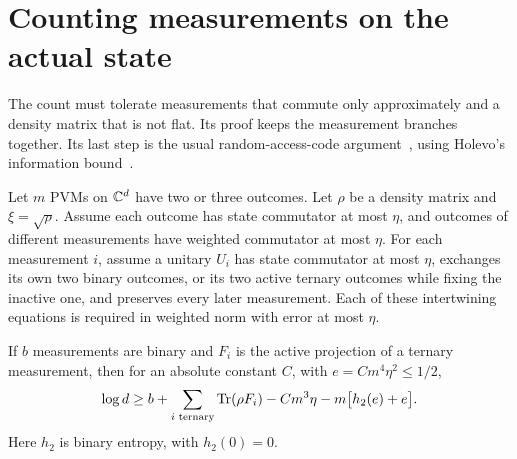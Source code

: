 \section{Counting measurements on the actual state}\label{sec:count}
The count must tolerate measurements that commute only approximately and a density matrix that is not flat. Its proof keeps the measurement branches together. Its last step is the usual random-access-code argument~\cite{Nay99}, using Holevo's information bound~\cite{Hol73}.

\begin{theorem}\label{thm:count}
Let $m$ PVMs on $\mathbb C^d$ have two or three outcomes. Let $\rho$ be a density matrix and $\xi=\sqrt\rho$. Assume each outcome has state commutator at most $\eta$, and outcomes of different measurements have weighted commutator at most $\eta$. For each measurement $i$, assume a unitary $U_i$ has state commutator at most $\eta$, exchanges its own two binary outcomes, or its two active ternary outcomes while fixing the inactive one, and preserves every later measurement. Each of these intertwining equations is required in weighted norm with error at most $\eta$.

If $b$ measurements are binary and $F_i$ is the active projection of a ternary measurement, then for an absolute constant $C$, with $e=Cm^4\eta^2\le1/2$,
\begin{equation}\label{eq:count}
 \log d\ge b+\sum_{i\text{ ternary}}\operatorname{Tr}(\rho F_i)
 -Cm^3\eta-m\bigl[h_2(e)+e\bigr].
\end{equation}
Here $h_2$ is binary entropy, with $h_2(0)=0$.
\end{theorem}

